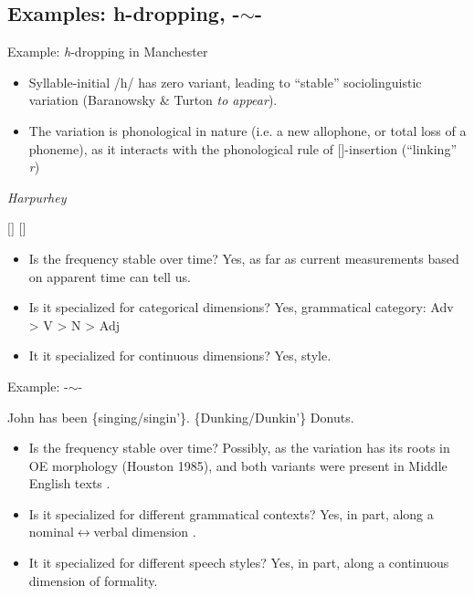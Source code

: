 \documentclass[hyperref={pdfpagelabels=false}]{beamer}
\begin{document}
\subsection{Examples: h-dropping, -$\sim$-}
\begin{frame}{Example: \textsl{h}-dropping in Manchester}
	\begin{itemize}
		\item Syllable-initial /h/ has zero variant, leading to ``stable'' sociolinguistic variation (Baranowsky \& Turton \textsl{to appear}).
		\item The variation is phonological in nature (i.e. a new allophone, or total loss of a phoneme), as it interacts with the phonological rule of []-insertion (``linking'' \textsl{r})
	\end{itemize}


	\begin{exe}
		\ex \quad \textsl{Harpurhey}
		\begin{xlist}
			\ex $[$$]$
			\ex $[$$]$
		\end{xlist}
	\end{exe}

	\begin{itemize}
		\item Is the frequency stable over time? Yes, as far as current measurements based on apparent time can tell us.
		\item Is it specialized for categorical dimensions? Yes, grammatical category: Adv > V > N > Adj 
		\item It it specialized for continuous dimensions? Yes, style.
	\end{itemize}


\end{frame}

\begin{frame}{Example: -$\sim$-}
	\begin{exe}
			\ex John has been \{singing/singin'\}.
			\ex \{Dunking/Dunkin'\} Donuts.
	\end{exe}
	\begin{itemize}
		\item Is the frequency stable over time? Possibly, as the variation has its roots in OE morphology (Houston 1985), and both variants were present in Middle English texts \citep{labov1989}.
		\item Is it specialized for different grammatical contexts? Yes, in part, along a nominal$\leftrightarrow$verbal dimension \citep{labov1989}.
		\item It it specialized for different speech styles? Yes, in part, along a continuous dimension of formality.
	\end{itemize}


\end{frame}
\end{document}
